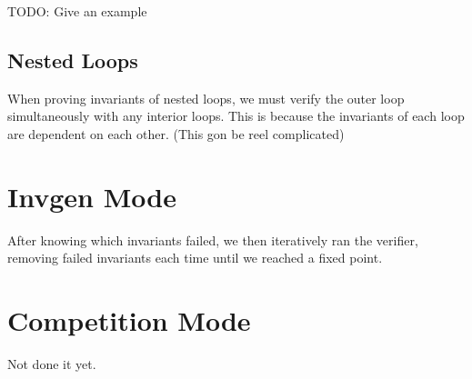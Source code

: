 \documentclass[11pt]{article}
\begin{document}
TODO: Give an example

\subsection{Nested Loops}

When proving invariants of nested loops, we must verify the outer loop simultaneously with any interior loops. This is because the invariants of each loop are dependent on each other. (This gon be reel complicated)

\section{Invgen Mode}

After knowing which invariants failed, we then iteratively ran the verifier, removing failed invariants each time until we reached a fixed point.

\section{Competition Mode}

Not done it yet.
\end{document}
